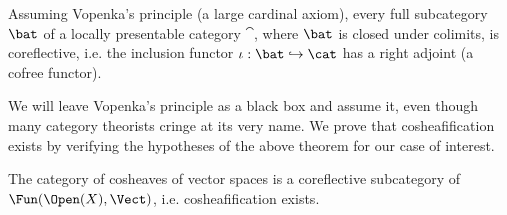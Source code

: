 \begin{thm}
Assuming Vopenka's principle (a large cardinal axiom), every full subcategory $\bat$ of a locally presentable category $\cat$, where $\bat$ is closed under colimits, is coreflective, i.e. the inclusion functor $\iota:\bat\hookrightarrow\cat$ has a right adjoint (a cofree functor).
\end{thm}

We will leave Vopenka's principle as a black box and assume it, even though many category theorists cringe at its very name. We prove that cosheafification exists by verifying the hypotheses of the above theorem for our case of interest.

\begin{cor}
The category of cosheaves of vector spaces is a coreflective subcategory of $\Fun(\Open(X),\Vect)$, i.e. cosheafification exists.
\end{cor}
